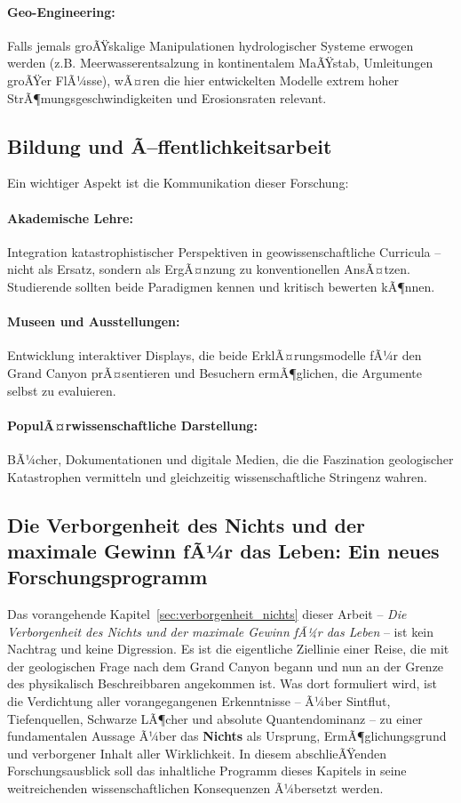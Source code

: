 ﻿\documentclass[12pt,a4paper]{report}
\begin{document}
\paragraph{Geo-Engineering:}
Falls jemals groÃŸskalige Manipulationen hydrologischer Systeme erwogen werden (z.B. Meerwasserentsalzung in kontinentalem MaÃŸstab, Umleitungen groÃŸer FlÃ¼sse), wÃ¤ren die hier entwickelten Modelle extrem hoher StrÃ¶mungsgeschwindigkeiten und Erosionsraten relevant.

\subsection{Bildung und Ã–ffentlichkeitsarbeit}

Ein wichtiger Aspekt ist die Kommunikation dieser Forschung:

\paragraph{Akademische Lehre:}
Integration katastrophistischer Perspektiven in geowissenschaftliche Curricula -- nicht als Ersatz, sondern als ErgÃ¤nzung zu konventionellen AnsÃ¤tzen. Studierende sollten beide Paradigmen kennen und kritisch bewerten kÃ¶nnen.

\paragraph{Museen und Ausstellungen:}
Entwicklung interaktiver Displays, die beide ErklÃ¤rungs\-modelle fÃ¼r den Grand Canyon prÃ¤sentieren und Besuchern ermÃ¶glichen, die Argumente selbst zu evaluieren.

\paragraph{PopulÃ¤rwissenschaftliche Darstellung:}
BÃ¼cher, Dokumentationen und digitale Medien, die die Faszination geologischer Katastrophen vermitteln und gleichzeitig wissenschaftliche Stringenz wahren.

\subsection{Die Verborgenheit des Nichts und der maximale Gewinn fÃ¼r das Leben: Ein neues Forschungsprogramm}
\label{sec:ausblick_nichts_programm}

Das vorangehende Kapitel~\ref{sec:verborgenheit_nichts} dieser Arbeit -- \textit{Die Verborgenheit des Nichts und der maximale Gewinn fÃ¼r das Leben} -- ist kein Nachtrag und keine Digression. Es ist die eigentliche Ziellinie einer Reise, die mit der geologischen Frage nach dem Grand Canyon begann und nun an der Grenze des physikalisch Beschreibbaren angekommen ist. Was dort formuliert wird, ist die Verdichtung aller vorangegangenen Erkenntnisse -- Ã¼ber Sintflut, Tiefenquellen, Schwarze LÃ¶cher und absolute Quantendominanz -- zu einer fundamentalen Aussage Ã¼ber das \textbf{Nichts} als Ursprung, ErmÃ¶glichungsgrund und verborgener Inhalt aller Wirklichkeit. In diesem abschlieÃŸenden Forschungsausblick soll das inhaltliche Programm dieses Kapitels in seine weitreichenden wissenschaftlichen Konsequenzen Ã¼bersetzt werden.
\end{document}
